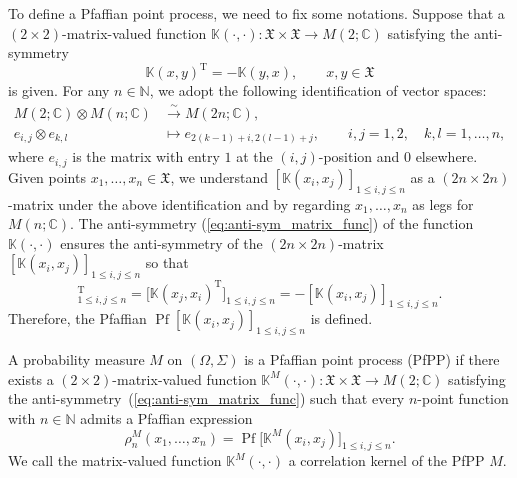 \documentclass[pdftex]{sigma}
\numberwithin{equation}{section}
\newcommand{\pf}{\operatorname{Pf}}
\newcommand{\mfrak}[1]{\mathfrak{#1}}
\newcommand{\mbb}[1]{\mathbb{#1}}
\newcommand{\mrm}[1]{\mathrm{#1}}
\begin{document}
To define a Pfaffian point process, we need to fix some notations.
Suppose that a $(2\times 2)$-matrix-valued function $\mbb{K}(\cdot,\cdot)\colon \mfrak{X}\times\mfrak{X}\to M(2;\mbb{C})$ satisfying the anti-symmetry
\begin{equation}\label{eq:anti-sym_matrix_func}
	\mbb{K}(x,y)^{\mrm{T}}=-\mbb{K}(y,x),\qquad x, y\in\mfrak{X}
\end{equation}
is given. For any $n\in\mbb{N}$, we adopt the following identification of vector spaces:
\begin{align*}
	M(2;\mbb{C})\otimes M(n;\mbb{C}) & \xrightarrow{\sim} M(2n;\mbb{C}),\\
	 e_{i,j}\otimes e_{k,l}&\mapsto e_{2(k-1)+i, 2(l-1)+j},\qquad i,j=1,2,\quad k,l=1,\dots, n,
\end{align*}
where $e_{i,j}$ is the matrix with entry $1$ at the $(i,j)$-position and $0$ elsewhere.
Given points $x_{1},\dots, x_{n}\in\mfrak{X}$, we understand $[\mbb{K}(x_{i},x_{j})]_{1\le i,j\le n}$ as a $(2n\times 2n)$-matrix under the above identification and by regarding $x_{1},\dots, x_{n}$ as legs for $M(n;\mbb{C})$. The anti-symmetry (\ref{eq:anti-sym_matrix_func}) of the function $\mbb{K}(\cdot,\cdot)$ ensures the anti-symmetry of the $(2n\times 2n)$-matrix $[\mbb{K}(x_{i},x_{j})]_{1\le i,j\le n}$ so that
\begin{equation*}
[\mbb{K}(x_{i},x_{j})]_{1\le i,j\le n}^{\mrm{T}}=\big[\mbb{K}(x_{j},x_{i})^{\mrm{T}}\big]_{1\le i,j\le n}=-[\mbb{K}(x_{i},x_{j})]_{1\le i,j\le n}.
\end{equation*}
Therefore, the Pfaffian $\pf [\mbb{K}(x_{i},x_{j})]_{1\le i,j\le n}$ is defined.

\begin{Definition}
A probability measure $M$ on $(\Omega,\Sigma)$ is a Pfaffian point process (PfPP) if there exists a $(2\times 2)$-matrix-valued function $\mbb{K}^{M}(\cdot,\cdot)\colon \mfrak{X}\times\mfrak{X}\to M(2;\mbb{C})$ satisfying the anti-symmetry~(\ref{eq:anti-sym_matrix_func}) such that every $n$-point function with $n\in\mbb{N}$ admits a Pfaffian expression
\begin{equation*}
	\rho_{n}^{M}(x_{1},\dots, x_{n})=\pf \big[\mbb{K}^{M}(x_{i},x_{j})\big]_{1\le i,j\le n}.
\end{equation*}
We call the matrix-valued function $\mbb{K}^{M}(\cdot,\cdot)$ a correlation kernel of the PfPP $M$.
\end{Definition}
\end{document}
